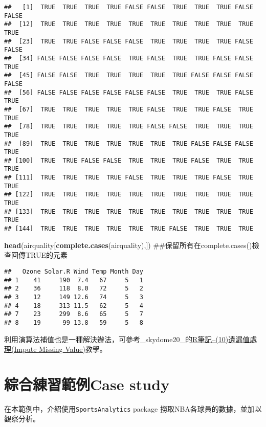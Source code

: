 \documentclass[]{book}
\newenvironment{Shaded}{\begin{snugshade}}{\end{snugshade}}
\newcommand{\KeywordTok}[1]{\textcolor[rgb]{0.13,0.29,0.53}{\textbf{{#1}}}}
\newcommand{\NormalTok}[1]{{#1}}
\begin{document}
\begin{verbatim}
##   [1]  TRUE  TRUE  TRUE  TRUE FALSE FALSE  TRUE  TRUE  TRUE FALSE FALSE
##  [12]  TRUE  TRUE  TRUE  TRUE  TRUE  TRUE  TRUE  TRUE  TRUE  TRUE  TRUE
##  [23]  TRUE  TRUE FALSE FALSE FALSE  TRUE  TRUE  TRUE  TRUE FALSE FALSE
##  [34] FALSE FALSE FALSE FALSE  TRUE FALSE  TRUE  TRUE FALSE FALSE  TRUE
##  [45] FALSE FALSE  TRUE  TRUE  TRUE  TRUE  TRUE FALSE FALSE FALSE FALSE
##  [56] FALSE FALSE FALSE FALSE FALSE FALSE  TRUE  TRUE  TRUE FALSE  TRUE
##  [67]  TRUE  TRUE  TRUE  TRUE  TRUE FALSE  TRUE  TRUE FALSE  TRUE  TRUE
##  [78]  TRUE  TRUE  TRUE  TRUE  TRUE FALSE FALSE  TRUE  TRUE  TRUE  TRUE
##  [89]  TRUE  TRUE  TRUE  TRUE  TRUE  TRUE  TRUE FALSE FALSE FALSE  TRUE
## [100]  TRUE  TRUE FALSE FALSE  TRUE  TRUE  TRUE FALSE  TRUE  TRUE  TRUE
## [111]  TRUE  TRUE  TRUE  TRUE FALSE  TRUE  TRUE  TRUE FALSE  TRUE  TRUE
## [122]  TRUE  TRUE  TRUE  TRUE  TRUE  TRUE  TRUE  TRUE  TRUE  TRUE  TRUE
## [133]  TRUE  TRUE  TRUE  TRUE  TRUE  TRUE  TRUE  TRUE  TRUE  TRUE  TRUE
## [144]  TRUE  TRUE  TRUE  TRUE  TRUE  TRUE FALSE  TRUE  TRUE  TRUE
\end{verbatim}

\begin{Shaded}
\begin{Highlighting}[]
\KeywordTok{head}\NormalTok{(airquality[}\KeywordTok{complete.cases}\NormalTok{(airquality),]) ##保留所有在complete.cases()檢查回傳TRUE的元素}
\end{Highlighting}
\end{Shaded}

\begin{verbatim}
##   Ozone Solar.R Wind Temp Month Day
## 1    41     190  7.4   67     5   1
## 2    36     118  8.0   72     5   2
## 3    12     149 12.6   74     5   3
## 4    18     313 11.5   62     5   4
## 7    23     299  8.6   65     5   7
## 8    19      99 13.8   59     5   8
\end{verbatim}

利用演算法補值也是一種解決辦法，可參考\_skydome20\_的\href{http://www.rpubs.com/skydome20/R-Note10-Missing_Value}{R筆記--(10)遺漏值處理(Impute
Missing Value)}教學。

\section{綜合練習範例Case study}\label{manCase}

在本範例中，介紹使用\texttt{SportsAnalytics} \citep{R-SportsAnalytics}
package 撈取NBA各球員的數據，並加以觀察分析。
\end{document}
